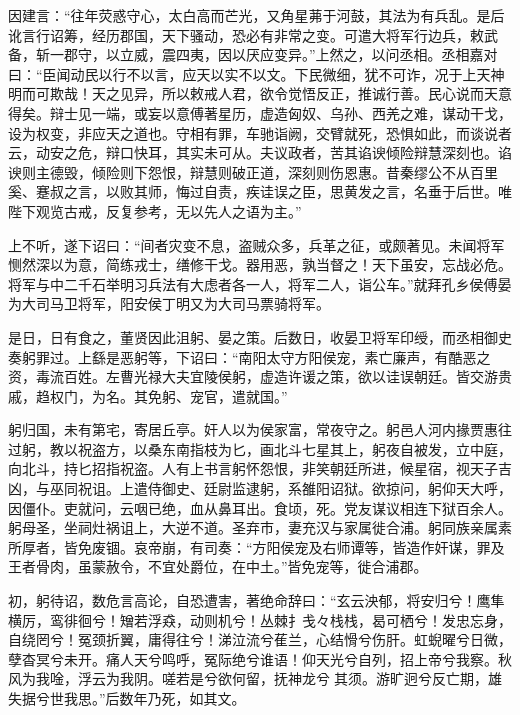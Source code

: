 \documentclass[12pt,UTF8]{ctexbook}
\begin{document}
因建言：“往年荧惑守心，太白高而芒光，又角星茀于河鼓，其法为有兵乱。是后讹言行诏筹，经历郡国，天下骚动，恐必有非常之变。可遣大将军行边兵，敕武备，斩一郡守，以立威，震四夷，因以厌应变异。”上然之，以问丞相。丞相嘉对曰：“臣闻动民以行不以言，应天以实不以文。下民微细，犹不可诈，况于上天神明而可欺哉！天之见异，所以敕戒人君，欲令觉悟反正，推诚行善。民心说而天意得矣。辩士见一端，或妄以意傅著星历，虚造匈奴、乌孙、西羌之难，谋动干戈，设为权变，非应天之道也。守相有罪，车驰诣阙，交臂就死，恐惧如此，而谈说者云，动安之危，辩口快耳，其实未可从。夫议政者，苦其谄谀倾险辩慧深刻也。谄谀则主德毁，倾险则下怨恨，辩慧则破正道，深刻则伤恩惠。昔秦缪公不从百里奚、蹇叔之言，以败其师，悔过自责，疾诖误之臣，思黄发之言，名垂于后世。唯陛下观览古戒，反复参考，无以先人之语为主。”



上不听，遂下诏曰：“间者灾变不息，盗贼众多，兵革之征，或颇著见。未闻将军恻然深以为意，简练戎士，缮修干戈。器用恶，孰当督之！天下虽安，忘战必危。将军与中二千石举明习兵法有大虑者各一人，将军二人，诣公车。”就拜孔乡侯傅晏为大司马卫将军，阳安侯丁明又为大司马票骑将军。



是日，日有食之，董贤因此沮躬、晏之策。后数日，收晏卫将军印绶，而丞相御史奏躬罪过。上繇是恶躬等，下诏曰：“南阳太守方阳侯宠，素亡廉声，有酷恶之资，毒流百姓。左曹光禄大夫宜陵侯躬，虚造许谖之策，欲以诖误朝廷。皆交游贵戚，趋权门，为名。其免躬、宠官，遣就国。”



躬归国，未有第宅，寄居丘亭。奸人以为侯家富，常夜守之。躬邑人河内掾贾惠往过躬，教以祝盗方，以桑东南指枝为匕，画北斗七星其上，躬夜自被发，立中庭，向北斗，持匕招指祝盗。人有上书言躬怀怨恨，非笑朝廷所进，候星宿，视天子吉凶，与巫同祝诅。上遣侍御史、廷尉监逮躬，系雒阳诏狱。欲掠问，躬仰天大呼，因僵仆。吏就问，云咽已绝，血从鼻耳出。食顷，死。党友谋议相连下狱百余人。躬母圣，坐祠灶祸诅上，大逆不道。圣弃市，妻充汉与家属徙合浦。躬同族亲属素所厚者，皆免废锢。哀帝崩，有司奏：“方阳侯宠及右师谭等，皆造作奸谋，罪及王者骨肉，虽蒙赦令，不宜处爵位，在中土。”皆免宠等，徙合浦郡。



初，躬待诏，数危言高论，自恐遭害，著绝命辞曰：“玄云泱郁，将安归兮！鹰隼横厉，鸾徘徊兮！矰若浮猋，动则机兮！丛棘扌戋々栈栈，曷可栖兮！发忠忘身，自绕罔兮！冤颈折翼，庸得往兮！涕泣流兮萑兰，心结愲兮伤肝。虹蜺曜兮日微，孽杳冥兮未开。痛人天兮鸣呼，冤际绝兮谁语！仰天光兮自列，招上帝兮我察。秋风为我唫，浮云为我阴。嗟若是兮欲何留，抚神龙兮其须。游旷迥兮反亡期，雄失据兮世我思。”后数年乃死，如其文。
\end{document}
